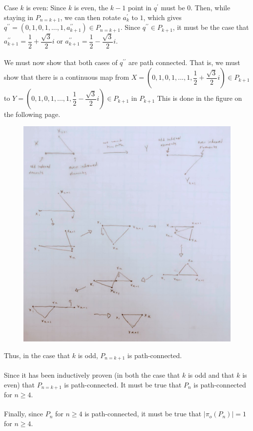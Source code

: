 \documentclass{article}
\begin{document}
Case $k$ is even: Since $k$ is even, the $k-1$ point in $q^\prime$ must be $0$. Then, while staying in $P_{n = k + 1}$, we can then rotate $a^\prime _k$ to $1$, which gives
$q^{\prime \prime} = (0,1,0,1,... ,1,a^{\prime \prime}_{k+1}) \in P_{n = k + 1}$.
Since $q^{\prime \prime} \in P_{k + 1}$, it must be the case that
$a^{\prime \prime} _{k + 1} = \dfrac{1}{2} + \dfrac{\sqrt{3}}{2}i$
or $a^{\prime \prime} _{k + 1} = \dfrac{1}{2} - \dfrac{\sqrt{3}}{2}i$. \\\\
We must now show that both cases of $q^{\prime \prime}$ are path connected. That is, we must show that there is a continuous map from 
$X = (0,1,0,1,... ,1,\dfrac{1}{2} + \dfrac{\sqrt{3}}{2}i) \in P_{k + 1} $ to
$Y = (0,1,0,1,... ,1,\dfrac{1}{2} - \dfrac{\sqrt{3}}{2}i) \in P_{k + 1} $
in $P_{k+1}$
This is done in the figure on the following page.
\newpage
\begin{figure}[h]
	\centering
	\includegraphics[width=5in]{path-connected.png}
\end{figure}
Thus, in the case that $k$ is odd, $P_{n = k + 1}$ is path-connected. \\\\
Since it has been inductively proven (in both the case that $k$ is odd and that $k$ is even) that $P_{n = k + 1}$ is path-connected. It must be true that $P_n$ is path-connected for $n \geq 4$. \\\\
Finally, since $P_n$ for $n \geq 4$ is path-connected, it must be true that $| \pi_o (P_n) | = 1$ for $n \geq 4$.
\end{document}
